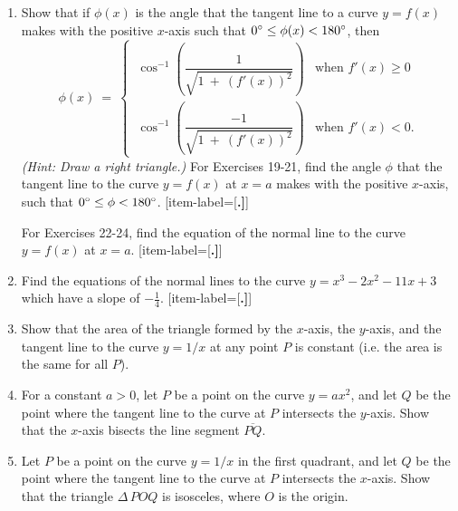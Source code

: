 {\begin{enumerate}[item-label={\bfseries \arabic*.}]
 \item Show that if $\phi(x)$ is the angle that the tangent line to a curve
  $y = f(x)$ makes with the positive $x$-axis such that
  $0^\circ \le \phi(x) < 180^\circ$, then
\[
\phi(x) ~=~
\begin{cases}
~\cos^{-1} \left(\dfrac{1}{\sqrt{1 ~+~ (f'(x))^2}}\right) & \text{when $f'(x) \ge 0$}\\[12pt]
~\cos^{-1} \left(\dfrac{-1}{\sqrt{1 ~+~ (f'(x))^2}}\right) & \text{when $f'(x) < 0$.}
\end{cases}
\]
\emph{(Hint: Draw a right triangle.)}
\noindent For Exercises 19-21, find the angle $\phi$ that the tangent line to the
curve $y=f(x)$ at $x=a$ makes with the positive $x$-axis, such that
$0^\circ \le \phi < 180^\circ$.
[item-label={{[\bfseries \arabic*.]}}]
\par\noindent For Exercises 22-24, find the equation of the normal line to the
curve $y = f(x)$ at $x = a$.
[item-label={{[\bfseries \arabic*.]}}]
\item Find the equations of the normal lines to the curve
  $y = x^3 - 2x^2 - 11x + 3$ which have a slope of $-\frac{1}{4}$.
[item-label={{[\bfseries \arabic*.]}}]
 \item Show that the area of the triangle formed by the $x$-axis, the $y$-axis, and the
tangent line to the curve $y = 1/x$ at any point $P$ is constant (i.e. the area is the
same for all $P$).
 \item For a constant $a > 0$, let $P$ be a point on the curve $y = ax^2$, and let $Q$
be the point where the tangent line to the curve at $P$ intersects the $y$-axis. Show that
the $x$-axis bisects the line segment $\overline{PQ}$.
 \item Let $P$ be a point on the curve $y = 1/x$ in the first quadrant, and let $Q$ be the
point where the tangent line to the curve at $P$ intersects the $x$-axis. Show that the
triangle $\Delta\,POQ$ is isosceles, where $O$ is the origin.
\end{enumerate}}
\newpage
